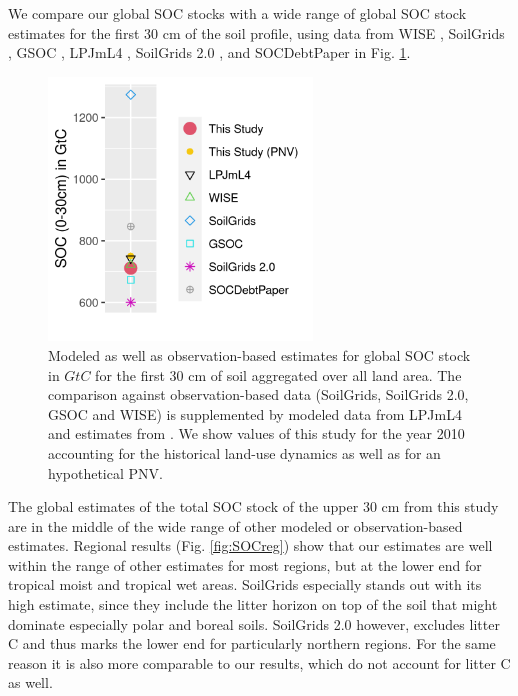 \documentclass[gc, manuscript]{copernicus}
\begin{document}
We compare our global SOC stocks with a wide range of global SOC stock estimates for the first 30 cm of the soil profile, using data from WISE \citep{batjes_harmonized_2016}, SoilGrids \citep{hengl_soilgrids250m_2017}, GSOC \citep{fao_global_2018}, LPJmL4 \citep{schaphoff_lpjml4_2018-1}, SoilGrids 2.0 \citep{poggio_soilgrids_2021}, and SOCDebtPaper \citep{sanderman_soil_2017} in Fig. \ref{fig:SOCglo}.

\begin{figure}[h]
\includegraphics[width=7cm]{../ResultNotebooks/Output/Images/glo_comparisonfigure} \caption{Modeled as well as observation-based estimates for global SOC stock in $\unit{GtC}$ for the first 30 cm of soil aggregated over all land area. The comparison against observation-based data (SoilGrids, SoilGrids 2.0, GSOC and WISE) is supplemented by modeled data from LPJmL4 \citep{schaphoff_lpjml4_2018-1} and estimates from \citep{sanderman_soil_2017}. We show values of this study for the year 2010 accounting for the historical land-use dynamics as well as for an hypothetical PNV.}\label{fig:SOCglo}
\end{figure}

The global estimates of the total SOC stock of the upper 30 cm from this study are in the middle of the wide range of other modeled or observation-based estimates. Regional results (Fig. \ref{fig:SOCreg}) show that our estimates are well within the range of other estimates for most regions, but at the lower end for tropical moist and tropical wet areas. SoilGrids \citep{hengl_soilgrids250m_2017} especially stands out with its high estimate, since they include the litter horizon on top of the soil that might dominate especially polar and boreal soils. SoilGrids 2.0 \citep{poggio_soilgrids_2021} however, excludes litter C and thus marks the lower end for particularly northern regions. For the same reason it is also more comparable to our results, which do not account for litter C as well.
\end{document}
